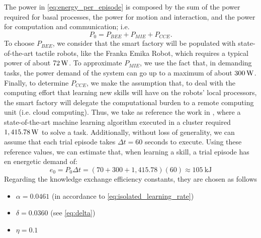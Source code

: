 The power in \eqref{eq:energy_per_episode} is composed by the sum of the power required for basal processes, the power for motion and interaction, and the power for computation and communication; i.e.
\begin{equation}
    P_0 = P_{BEE}+P_{MIE} + P_{CCE}.
\end{equation}
To choose $P_{BEE}$, we consider that the smart factory will be populated with state-of-the-art tactile robots, like the Franka Emika Robot, which requires a typical power of about $\unit[72]{W}$. To approximate $P_{MIE}$, we use the fact that, in demanding tasks, the power demand of the system can go up to a maximum of about $ \unit[300] {W} $. Finally, to determine $P_{CCE}$, we make the assumption that, to deal with the computing effort that learning new skills will have on the robots' local processors, the smart factory will delegate the computational burden to a remote computing unit (i.e. cloud computing). Thus, we take as reference the work in \cite{Strubell2019EnergyAP}, where a state-of-the-art machine learning algorithm executed in a cluster required $\unit[1,415.78]{W}$ to solve a task. Additionally, without loss of generality, we can assume that each trial episode takes $\Delta t = 60$ seconds to execute. Using these reference values, we can estimate that, when learning a skill, a trial episode has en energetic demand of:
\begin{equation}
	e_0 = P_0 \Delta t = \left(70 + 300 + 1,415.78\right) \left(60\right) \approx 105~\text{kJ}
\end{equation}
Regarding the knowledge exchange efficiency constants, they are chosen as follows
\begin{itemize}
	\item $\alpha =  0.0461$ (in accordance to \eqref{eq:isolated_learning_rate})
	\item $\delta =  0.0360$ (see \eqref{eq:delta})
	\item $\eta= 0.1$
\end{itemize} 

